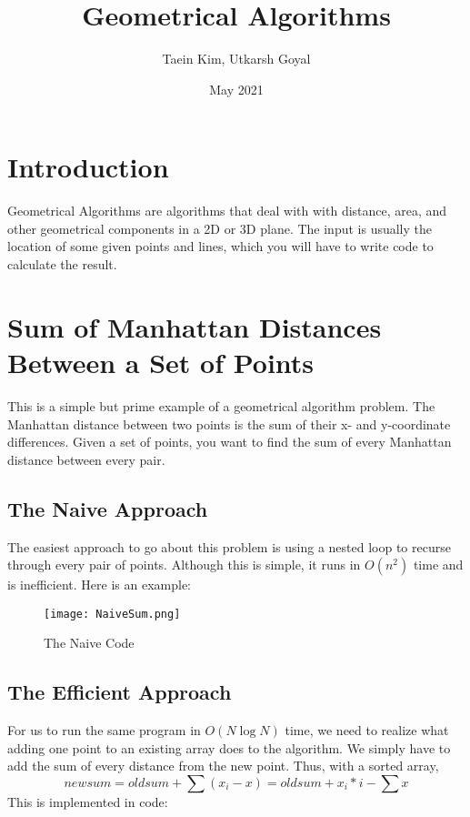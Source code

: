 \documentclass{article}
\title{Geometrical Algorithms}
\author{Taein Kim, Utkarsh Goyal}
\date{May 2021}
\begin{document}
\maketitle

\section{Introduction}

Geometrical Algorithms are algorithms that deal with with distance, area, and other geometrical components in a 2D or 3D plane. The input is usually the location of some given points and lines, which you will have to write code to calculate the result.

\section{Sum of Manhattan Distances Between a Set of Points}

This is a simple but prime example of a geometrical algorithm problem. The Manhattan distance between two points is the sum of their x- and y-coordinate differences. Given a set of points, you want to find the sum of every Manhattan distance between every pair.

\subsection{The Naive Approach}

The easiest approach to go about this problem is using a nested loop to recurse through every pair of points. Although this is simple, it runs in $O(n^2)$ time and is inefficient. Here is an example:

\begin{figure}[htp]
    \centering
    \texttt{[image: NaiveSum.png]}
    \caption{The Naive Code}
\end{figure}

\subsection{The Efficient Approach}

For us to run the same program in $O(N \log N)$ time, we need to realize what adding one point to an existing array does to the algorithm. We simply have to add the sum of every distance from the new point. Thus, with a sorted array, 
\[newsum = oldsum + \sum{(x_i-x)} = oldsum + x_i * i - \sum{x}\]
This is implemented in code:
\end{document}
